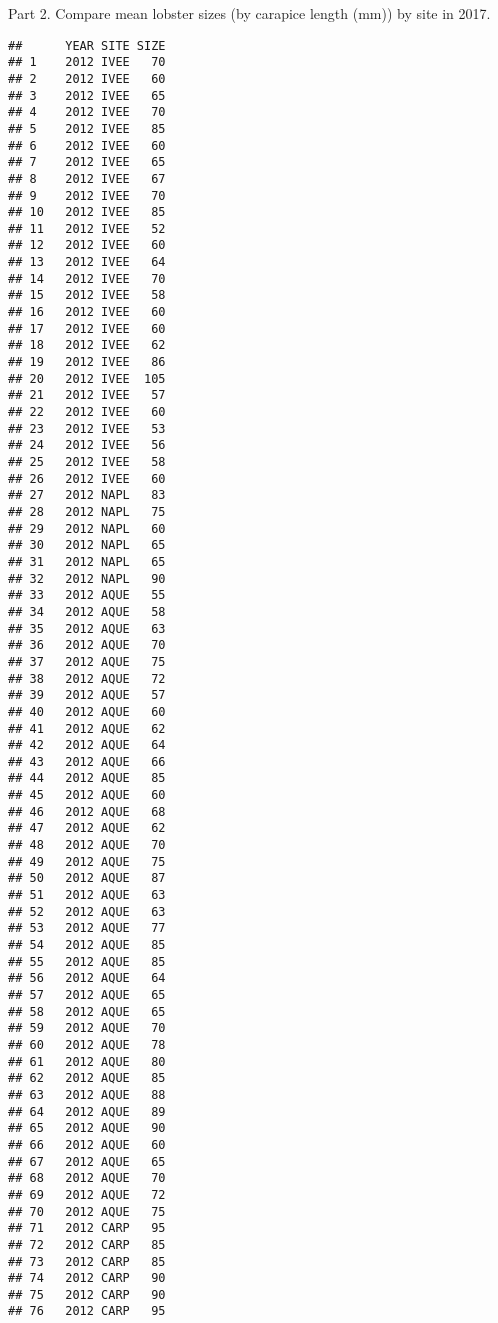\documentclass[]{article}
\newenvironment{Shaded}{\begin{snugshade}}{\end{snugshade}}
\newcommand{\KeywordTok}[1]{\textcolor[rgb]{0.13,0.29,0.53}{\textbf{#1}}}
\newcommand{\DataTypeTok}[1]{\textcolor[rgb]{0.13,0.29,0.53}{#1}}
\newcommand{\StringTok}[1]{\textcolor[rgb]{0.31,0.60,0.02}{#1}}
\newcommand{\CommentTok}[1]{\textcolor[rgb]{0.56,0.35,0.01}{\textit{#1}}}
\newcommand{\OperatorTok}[1]{\textcolor[rgb]{0.81,0.36,0.00}{\textbf{#1}}}
\newcommand{\NormalTok}[1]{#1}
\begin{document}
Part 2. Compare mean lobster sizes (by carapice length (mm)) by site in
2017.

\begin{Shaded}
\end{Shaded}

\begin{verbatim}
##      YEAR SITE SIZE
## 1    2012 IVEE   70
## 2    2012 IVEE   60
## 3    2012 IVEE   65
## 4    2012 IVEE   70
## 5    2012 IVEE   85
## 6    2012 IVEE   60
## 7    2012 IVEE   65
## 8    2012 IVEE   67
## 9    2012 IVEE   70
## 10   2012 IVEE   85
## 11   2012 IVEE   52
## 12   2012 IVEE   60
## 13   2012 IVEE   64
## 14   2012 IVEE   70
## 15   2012 IVEE   58
## 16   2012 IVEE   60
## 17   2012 IVEE   60
## 18   2012 IVEE   62
## 19   2012 IVEE   86
## 20   2012 IVEE  105
## 21   2012 IVEE   57
## 22   2012 IVEE   60
## 23   2012 IVEE   53
## 24   2012 IVEE   56
## 25   2012 IVEE   58
## 26   2012 IVEE   60
## 27   2012 NAPL   83
## 28   2012 NAPL   75
## 29   2012 NAPL   60
## 30   2012 NAPL   65
## 31   2012 NAPL   65
## 32   2012 NAPL   90
## 33   2012 AQUE   55
## 34   2012 AQUE   58
## 35   2012 AQUE   63
## 36   2012 AQUE   70
## 37   2012 AQUE   75
## 38   2012 AQUE   72
## 39   2012 AQUE   57
## 40   2012 AQUE   60
## 41   2012 AQUE   62
## 42   2012 AQUE   64
## 43   2012 AQUE   66
## 44   2012 AQUE   85
## 45   2012 AQUE   60
## 46   2012 AQUE   68
## 47   2012 AQUE   62
## 48   2012 AQUE   70
## 49   2012 AQUE   75
## 50   2012 AQUE   87
## 51   2012 AQUE   63
## 52   2012 AQUE   63
## 53   2012 AQUE   77
## 54   2012 AQUE   85
## 55   2012 AQUE   85
## 56   2012 AQUE   64
## 57   2012 AQUE   65
## 58   2012 AQUE   65
## 59   2012 AQUE   70
## 60   2012 AQUE   78
## 61   2012 AQUE   80
## 62   2012 AQUE   85
## 63   2012 AQUE   88
## 64   2012 AQUE   89
## 65   2012 AQUE   90
## 66   2012 AQUE   60
## 67   2012 AQUE   65
## 68   2012 AQUE   70
## 69   2012 AQUE   72
## 70   2012 AQUE   75
## 71   2012 CARP   95
## 72   2012 CARP   85
## 73   2012 CARP   85
## 74   2012 CARP   90
## 75   2012 CARP   90
## 76   2012 CARP   95

\end{verbatim}
\end{document}
